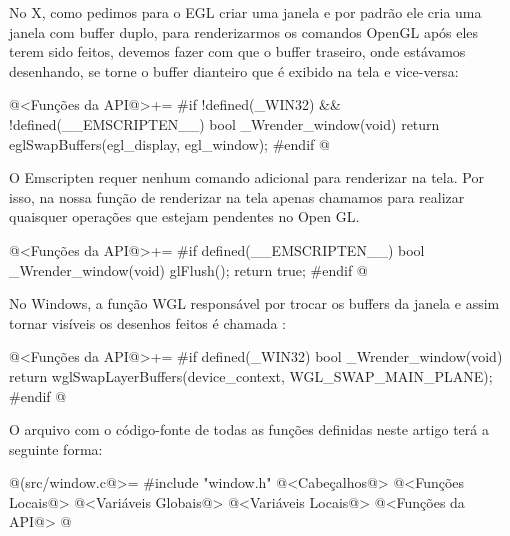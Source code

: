 
No X, como pedimos para o EGL criar uma janela e por padrão ele cria
uma janela com buffer duplo, para renderizarmos os comandos OpenGL
após eles terem sido feitos, devemos fazer com que o buffer traseiro,
onde estávamos desenhando, se torne o buffer dianteiro que é exibido
na tela e vice-versa:

\iniciocodigo
@<Funções da API@>+=
#if !defined(_WIN32) && !defined(__EMSCRIPTEN__)
bool _Wrender_window(void){
  return eglSwapBuffers(egl_display, egl_window);
}
#endif
@
\fimcodigo


O Emscripten requer nenhum comando adicional para renderizar na
tela. Por isso, na nossa função de renderizar na tela apenas
chamamos  para realizar quaisquer operações que
estejam pendentes no Open GL.

\iniciocodigo
@<Funções da API@>+=
#if defined(__EMSCRIPTEN__)
bool _Wrender_window(void){
  glFlush();
  return true;
}
#endif
@
\fimcodigo


No Windows, a função WGL responsável por trocar os buffers da janela e
assim tornar visíveis os desenhos feitos é
chamada :

\iniciocodigo
@<Funções da API@>+=
#if defined(_WIN32)
bool _Wrender_window(void){
  return wglSwapLayerBuffers(device_context, WGL_SWAP_MAIN_PLANE);
}
#endif
@
\fimcodigo


O arquivo com o código-fonte de todas as funções definidas neste
artigo terá a seguinte forma:

\iniciocodigo
@(src/window.c@>=
#include "window.h"
@<Cabeçalhos@>
@<Funções Locais@>
@<Variáveis Globais@>
@<Variáveis Locais@>
@<Funções da API@>
@
\fimcodigo


\fim
